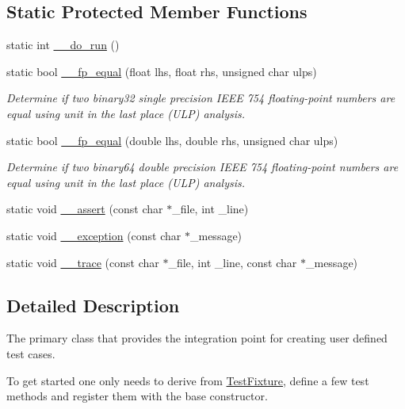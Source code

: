 \subsection*{Static Protected Member Functions}
\begin{DoxyCompactItemize}
\item 
static int \mbox{\hyperlink{classtpunit_1_1TestFixture_a7231fffb71c3c8ce3c00225cf81a7616}{\+\_\+\+\_\+do\+\_\+run}} ()
\item 
static bool \mbox{\hyperlink{classtpunit_1_1TestFixture_aa20959e2ba54953d3af60271ce416245}{\+\_\+\+\_\+fp\+\_\+equal}} (float lhs, float rhs, unsigned char ulps)
\begin{DoxyCompactList}\small\item\em Determine if two binary32 single precision I\+E\+EE 754 floating-\/point numbers are equal using unit in the last place (U\+LP) analysis. \end{DoxyCompactList}\item 
static bool \mbox{\hyperlink{classtpunit_1_1TestFixture_a123835a9d71498b0f1b3d92a4f5b3c2b}{\+\_\+\+\_\+fp\+\_\+equal}} (double lhs, double rhs, unsigned char ulps)
\begin{DoxyCompactList}\small\item\em Determine if two binary64 double precision I\+E\+EE 754 floating-\/point numbers are equal using unit in the last place (U\+LP) analysis. \end{DoxyCompactList}\item 
static void \mbox{\hyperlink{classtpunit_1_1TestFixture_af9b0664a0d20af0d7dc777b3e3056c34}{\+\_\+\+\_\+assert}} (const char $\ast$\+\_\+file, int \+\_\+line)
\item 
static void \mbox{\hyperlink{classtpunit_1_1TestFixture_a1c444e5d0d3ad5f48b77dce26551ca9e}{\+\_\+\+\_\+exception}} (const char $\ast$\+\_\+message)
\item 
static void \mbox{\hyperlink{classtpunit_1_1TestFixture_acc41c68bf4068ec295aa6dc5e4c3b37a}{\+\_\+\+\_\+trace}} (const char $\ast$\+\_\+file, int \+\_\+line, const char $\ast$\+\_\+message)
\end{DoxyCompactItemize}


\subsection{Detailed Description}
The primary class that provides the integration point for creating user defined test cases. 

To get started one only needs to derive from \mbox{\hyperlink{classtpunit_1_1TestFixture}{Test\+Fixture}}, define a few test methods and register them with the base constructor. 

